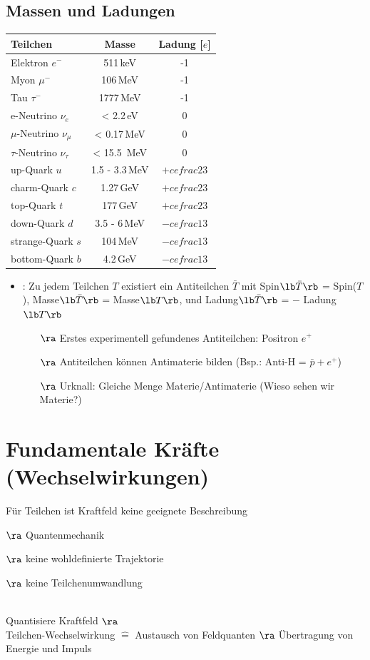 \subsection{Massen und Ladungen}
\begin{center}
\begin{tabular}{l | c | c}
Teilchen & Masse & Ladung [$e$]\\
\hline
Elektron $e^-$ & 511\,keV & -1 \\
Myon $\mu^-$ & 106\,MeV & -1\\
Tau $\tau^-$ & 1777\,MeV & -1\\
e-Neutrino $\nu_e$ & < 2.2\,eV & 0\\
$\mu$-Neutrino $\nu_\mu$ & < 0.17\,MeV & 0\\
$\tau$-Neutrino $\nu_\tau$ & < 15.5\, MeV & 0\\
up-Quark $u$ & 1.5 - 3.3\,MeV & $+cefrac{2}{3}$\\
charm-Quark $c$ & 1.27\,GeV & $+cefrac{2}{3}$\\
top-Quark $t$ & 177\,GeV & $+cefrac{2}{3}$\\
down-Quark $d$ & 3.5 - 6\,MeV & $-cefrac{1}{3}$\\
strange-Quark $s$ & 104\,MeV & $-cefrac{1}{3}$\\
bottom-Quark $b$ & 4.2\,GeV & $-cefrac{1}{3}$
\end{tabular}
\end{center}
\begin{itemize}
\item {}: Zu jedem Teilchen $T$ existiert ein Antiteilchen $\bar{T}$ mit Spin$\lb \bar{T}\rb $ = Spin($T$), \newline Masse$\lb \bar{T}\rb $ = Masse$\lb T\rb $,  und Ladung$\lb \bar{T}\rb $ = $-$ Ladung$\lb T\rb $
\begin{itemize}
\item[$\ra$] Erstes experimentell gefundenes Antiteilchen: Positron $e^+$
\item[$\ra$] Antiteilchen können Antimaterie bilden (Bsp.: Anti-H = $\bar{p} +e^+$)
\item[$\ra$] Urknall: Gleiche Menge Materie/Antimaterie (Wieso sehen wir Materie?)
\end{itemize}
\end{itemize}
\section{Fundamentale Kräfte (Wechselwirkungen)}
Für Teilchen ist \glqq Kraftfeld\grqq{} keine geeignete Beschreibung
\begin{compactitem}
\item[$\ra$] Quantenmechanik 
\item[$\ra$] keine wohldefinierte Trajektorie
\item[$\ra$] keine Teilchenumwandlung
\end{compactitem}
\\
Quantisiere Kraftfeld $\ra$ \\
Teilchen-Wechselwirkung $\hat{=}$ Austausch von Feldquanten $\ra$ Übertragung von Energie und Impuls

